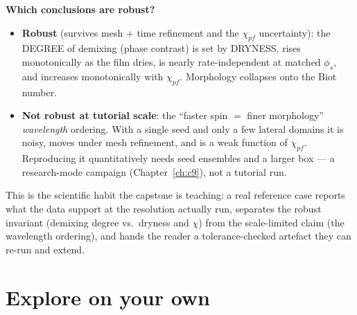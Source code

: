 \begin{keybox}
\textbf{Which conclusions are robust?}
\begin{itemize}[nosep]
\item \textbf{Robust} (survives mesh + time refinement and the $\chi_{pf}$
  uncertainty): the DEGREE of demixing (phase contrast) is set by DRYNESS, rises
  monotonically as the film dries, is nearly rate-independent at matched
  $\phi_s$, and increases monotonically with $\chi_{pf}$. Morphology collapses
  onto the Biot number.
\item \textbf{Not robust at tutorial scale}: the ``faster spin $=$ finer
  morphology'' \emph{wavelength} ordering. With a single seed and only a few
  lateral domains it is noisy, moves under mesh refinement, and is a weak
  function of $\chi_{pf}$. Reproducing it quantitatively needs seed ensembles
  and a larger box --- a research-mode campaign (Chapter~\ref{ch:c9}), not a
  tutorial run.
\end{itemize}
\end{keybox}

This is the scientific habit the capstone is teaching: a real reference case
reports what the data support at the resolution actually run, separates the
robust invariant (demixing degree vs.\ dryness and $\chi$) from the
scale-limited claim (the wavelength ordering), and hands the reader a
tolerance-checked artefact they can re-run and extend.

\section{Explore on your own}




